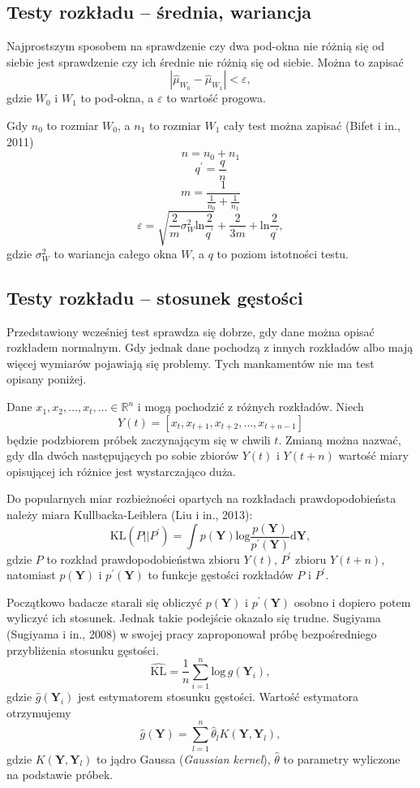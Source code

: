 \subsection{Testy rozkładu -- średnia, wariancja}
\label{sub:TestsMeanAndVar}
Najprostszym sposobem na sprawdzenie czy dwa pod-okna nie różnią się od siebie
jest sprawdzenie czy ich średnie nie różnią się od siebie.
Można to zapisać
$$ | \hat{\mu}_{W_{0}} - \hat{\mu}_{W_{1}} | < \varepsilon, $$
gdzie $W_{0}$ i $W_{1}$ to pod-okna, a $\varepsilon$ to wartość progowa.

Gdy $n_{0}$ to rozmiar $W_{0}$,
a $n_{1}$ to rozmiar $W_{1}$ cały test można zapisać (Bifet i in., 2011)
$$n = n_{0} + n_{1}$$
$$q^\prime = \frac{q}{n}$$
$$m=\frac{1}{\frac{1}{n_0}+\frac{1}{n_1}}$$
$$\varepsilon = \sqrt{\frac{2}{m} \sigma^{2}_{W} \mbox{ln}\frac{2}{q^\prime}} + \frac{2}{3m} + \mbox{ln}\frac{2}{q^\prime},$$
gdzie $\sigma^{2}_{W}$ to wariancja całego okna $W$,
a $q$ to poziom istotności testu.
\subsection{Testy rozkładu -- stosunek gęstości}
\label{sub:TestDensityRatio}
Przedstawiony wcześniej test sprawdza się dobrze,
gdy dane można opisać rozkładem normalnym.
Gdy jednak dane pochodzą z innych rozkładów albo mają więcej wymiarów pojawiają się problemy.
Tych mankamentów nie ma test opisany poniżej.

Dane $x_1,x_2,\ldots,x_t,\ldots \in \mathbb{R}^n$ i mogą pochodzić z różnych rozkładów.
Niech
$$ Y(t) = [{x_t, x_{t+1}, x_{t+2}, \ldots, x_{t+n-1}}]$$
będzie podzbiorem próbek zaczynającym się w chwili $t$.
Zmianą można nazwać,
gdy dla dwóch następujących po sobie zbiorów $Y(t)$ i $Y(t+n)$
wartość miary opisującej ich różnice jest wystarczająco duża.

Do popularnych miar rozbieżności opartych na rozkładach prawdopodobieństa należy miara Kullbacka-Leiblera (Liu i in., 2013):
$$\mbox{KL}(P||P^\prime) = \int p(\textbf{Y}) \mbox{log}\frac{p(\textbf{Y})}{p^\prime(\textbf{Y})} \mbox{d}\textbf{Y},$$
gdzie $P$ to rozkład prawdopodobieństwa zbioru $Y(t)$,
$P^\prime$ zbioru $Y(t+n)$,
natomiast $p(\textbf{Y})$ i $p^\prime(\textbf{Y})$ to funkcje gęstości rozkładów $P$ i $P^\prime$.

Początkowo badacze starali się obliczyć $p(\textbf{Y})$ i $p^\prime(\textbf{Y})$ osobno
i dopiero potem wyliczyć ich stosunek.
Jednak takie podejście okazało się trudne.
Sugiyama (Sugiyama i in., 2008) w swojej pracy zaproponował próbę bezpośredniego przybliżenia stosunku gęstości.
$$\hat{\mbox{KL}} = \frac{1}{n} \sum\limits_{i=1}^n \mbox{log}\,\hat{g}(\textbf{Y}_i),$$
gdzie $\hat{g}(\textbf{Y}_i)$ jest estymatorem stosunku gęstości.
Wartość estymatora otrzymujemy
$$\hat{g}(\textbf{Y}) = \sum\limits_{l=1}^n \hat{\theta}_l K(\textbf{Y}, \textbf{Y}_l),$$
gdzie $K(\textbf{Y}, \textbf{Y}_l)$ to jądro Gaussa (\textit{Gaussian kernel}), $\hat{\theta}$
to parametry wyliczone na podstawie próbek.
